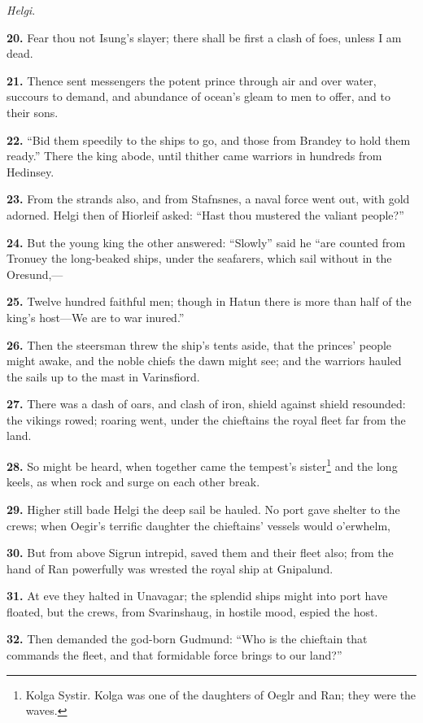 \emph{Helgi}.

\textbf{20.} Fear thou not Isung's slayer; there shall be first a clash of
foes, unless I am dead.

\textbf{21.} Thence sent messengers the potent prince through air and over
water, succours to demand, and abundance of ocean's gleam to men to
offer, and to their sons.

\textbf{22.} ``Bid them speedily to the ships to go, and those from Brandey to
hold them ready.'' There the king abode, until thither came warriors in
hundreds from Hedinsey.

\textbf{23.} From the strands also, and from Stafnsnes, a naval force went
out, with gold adorned. Helgi then of Hiorleif asked: ``Hast thou
mustered the valiant people?''

\textbf{24.} But the young king the other answered: ``Slowly'' said he ``are
counted from Tronuey the long-beaked ships, under the seafarers, which
sail without in the Oresund,—

\textbf{25.} Twelve hundred faithful men; though in Hatun there is more than
half of the king's host—We are to war inured.''

\textbf{26.} Then the steersman threw the ship's tents aside, that the
princes' people might awake, and the noble chiefs the dawn might see;
and the warriors hauled the sails up to the mast in Varinsfiord.

\textbf{27.} There was a dash of oars, and clash of iron, shield against
shield resounded: the vikings rowed; roaring went, under the
chieftains the royal fleet far from the land.

\textbf{28.} So might be heard, when together came the tempest's sister\footnote{Kolga Systir. Kolga was one of the daughters of Oeglr
and Ran; they were the waves.}
and the long keels, as when rock and surge on each other break.

\textbf{29.} Higher still bade Helgi the deep sail be hauled. No port gave
shelter to the crews; when Oegir's terrific daughter the chieftains'
vessels would o'erwhelm,

\textbf{30.} But from above Sigrun intrepid, saved them and their fleet also;
from the hand of Ran powerfully was wrested the royal ship at
Gnipalund.

\textbf{31.} At eve they halted in Unavagar; the splendid ships might into
port have floated, but the crews, from Svarinshaug, in hostile mood,
espied the host.

\textbf{32.} Then demanded the god-born Gudmund: ``Who is the chieftain that
commands the fleet, and that formidable force brings to our land?''

